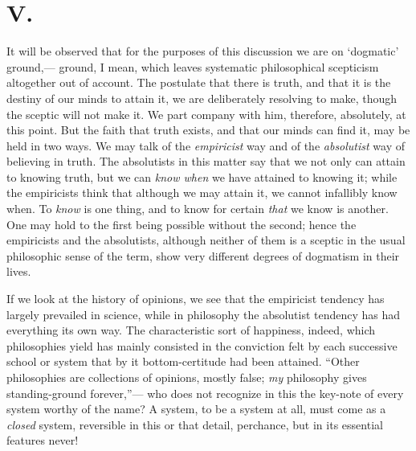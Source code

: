 \documentclass[12pt]{article}
\begin{document}

\section*{V.}

It will be observed that for the purposes of this discussion we are on `dogmatic' ground,--- ground, I mean, which leaves systematic philosophical scepticism altogether out of account.  The postulate that there is truth, and that it is the destiny of our minds to attain it, we are deliberately resolving to make, though the sceptic will not make it.  We part company with him, therefore, absolutely, at this point. But the faith that truth exists, and that our minds can find it, may be held in two ways.  We may talk of the \emph{empiricist} way and of the \emph{absolutist} way of believing in truth.  The absolutists in this matter say that we not only can attain to knowing truth, but we can \emph{know when} we have attained to knowing it; while the empiricists think that although we may attain it, we cannot infallibly know when.  To \emph{know} is one thing, and to know for certain \emph{that} we know is another.  One may hold to the first being possible without the second; hence the empiricists and the absolutists, although neither of them is a sceptic in the usual philosophic sense of the term, show very different degrees of dogmatism in their lives.

If we look at the history of opinions, we see that the empiricist tendency has largely prevailed in science, while in philosophy the absolutist tendency has had everything its own way.  The characteristic sort of happiness, indeed, which philosophies yield has mainly consisted in the conviction felt by each successive school or system that by it bottom-certitude had been attained.  ``Other philosophies are collections of opinions, mostly false; \emph{my} philosophy  gives standing-ground forever,''--- who does not recognize in this the key-note of every system worthy of the name?  A system, to be a system at all, must come as a \emph{closed} system, reversible in this or that detail, perchance, but in its essential features never!
\end{document}

